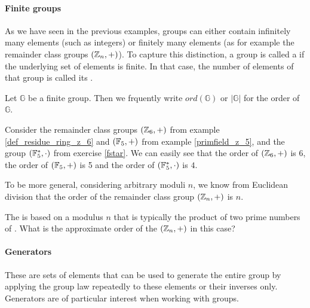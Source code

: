 \paragraph{Finite groups} As we have seen in the previous examples, groups can either contain infinitely many elements (such as integers) or finitely many elements (as for example the remainder class groups $(\mathbb{Z}_n,+)$). To capture this distinction, a group is called a  if the underlying set of elements is finite. In that case, the number of elements of that group is called its .
\begin{notation}
Let $\mathbb{G}$ be a finite group. Then we frquently write $ord(\mathbb{G})$ or  $|\mathbb{G}|$ for the order of $\mathbb{G}$.
\end{notation}
\begin{example}\label{Zn}
Consider the remainder class groups $(\mathbb{Z}_6,+)$ from example \ref{def_residue_ring_z_6} and $(\mathbb{F}_5,+)$  from example \ref{primfield_z_5}, and the group $(\mathbb{F}_5^*,\cdot)$ from exercise \ref{fstar}. We can easily see that the order of $(\mathbb{Z}_6,+)$ is $6$, the order of $(\mathbb{F}_5,+)$ is 5 and the order of $(\mathbb{F}_5^*,\cdot)$ is $4$.

To be more general, considering arbitrary moduli $n$, we know from Euclidean division that the order of the remainder class group $(\mathbb{Z}_n,+)$ is $n$.
\end{example}
\begin{exercise}The  is based on a modulus $n$ that is typically the product of two prime numbers of . What is the approximate order of the  $(\mathbb{Z}_n,+)$ in this case?
\end{exercise}
\paragraph{Generators} These are sets of elements that can be used to generate the entire group by applying the group law repeatedly to these elements or their inverses only. Generators are of particular interest when working with groups.

